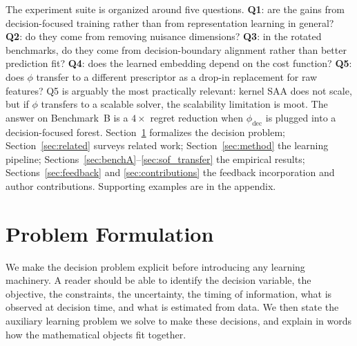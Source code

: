 \documentclass[11pt]{article}
\begin{document}
The experiment suite is organized around five questions. \textbf{Q1}: are the gains from decision-focused training rather than from representation learning in general? \textbf{Q2}: do they come from removing nuisance dimensions? \textbf{Q3}: in the rotated benchmarks, do they come from decision-boundary alignment rather than better prediction fit? \textbf{Q4}: does the learned embedding depend on the cost function? \textbf{Q5}: does $\phi$ transfer to a different prescriptor as a drop-in replacement for raw features? Q5 is arguably the most practically relevant: kernel SAA does not scale, but if $\phi$ transfers to a scalable solver, the scalability limitation is moot. The answer on Benchmark~B is a $4\times$ regret reduction when $\phi_{\mathrm{dec}}$ is plugged into a decision-focused forest. Section~\ref{sec:formulation} formalizes the decision problem; Section~\ref{sec:related} surveys related work; Section~\ref{sec:method} the learning pipeline; Sections~\ref{sec:benchA}--\ref{sec:sof_transfer} the empirical results; Sections~\ref{sec:feedback} and \ref{sec:contributions} the feedback incorporation and author contributions. Supporting examples are in the appendix.

\section{Problem Formulation}\label{sec:formulation}

We make the decision problem explicit before introducing any learning machinery. A reader should be able to identify the decision variable, the objective, the constraints, the uncertainty, the timing of information, what is observed at decision time, and what is estimated from data. We then state the auxiliary learning problem we solve to make these decisions, and explain in words how the mathematical objects fit together.
\end{document}
